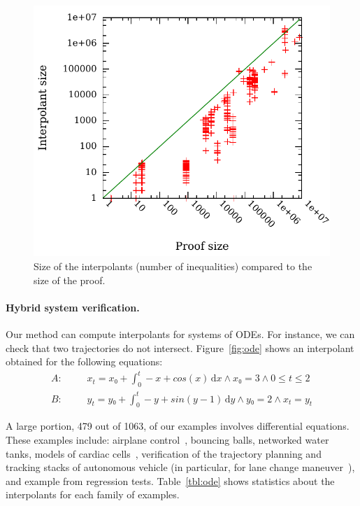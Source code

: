\begin{figure}
\centering
\includegraphics[scale=0.6]{img/itpsize2.pdf}
\caption{Size of the interpolants (number of inequalities) compared to the size of the proof.}
\label{fig:flyspeck}
\end{figure}


\paragraph{Hybrid system verification.}
Our method can compute interpolants for systems of ODEs.
For instance, we can check that two trajectories do not intersect.
Figure~\ref{fig:ode} shows an interpolant obtained for the following equations:
\begin{eqnarray*}
A: &~~~~&  x_t = x₀ + \int_0^t \! -x + cos(x) \, \mathrm{d}x ∧ x₀ = 3 ∧ 0 ≤ t ≤ 2 \\
B: &~~~~&  y_t = y₀ + \int_0^t \! -y + sin(y-1) \, \mathrm{d}y ∧ y₀ = 2 ∧ x_t = y_t
\end{eqnarray*}

A large portion, 479 out of 1063, of our examples involves differential equations.
These examples include:
airplane control~\cite{Bae201513},
bouncing balls, networked water tanks,
models of cardiac cells~\cite{DBLP:conf/cmsb/LiuKGZC14},
verification of the trajectory planning and tracking stacks of autonomous vehicle (in particular, for lane change maneuver~\cite{althoff2014online}),
and example from \dReal regression tests.
Table~\ref{tbl:ode} shows statistics about the interpolants for each family of examples.

